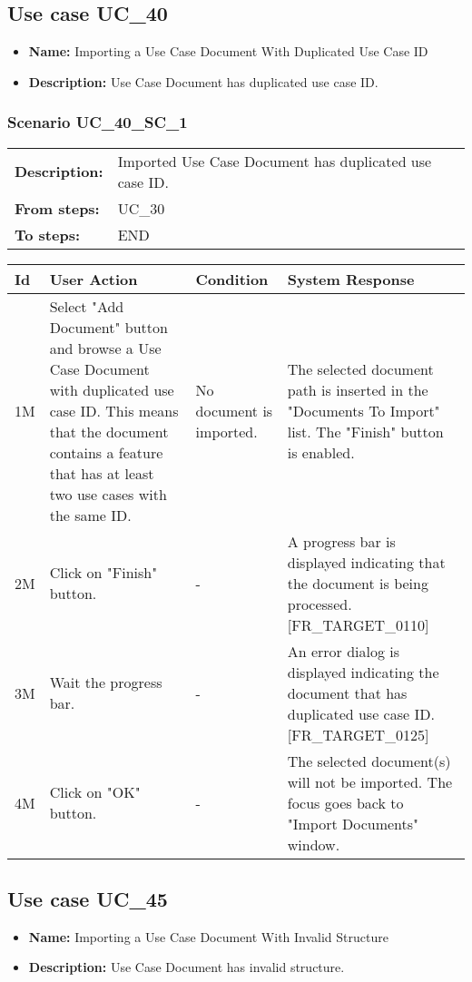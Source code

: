 \documentclass[a4paper,11pt]{article}
\newcommand{\bl}{\\ \hline}
\begin{document}
\subsection*{Use case UC_40}
\begin{itemize}
\item {\bf Name: }Importing a Use Case Document With Duplicated Use Case ID
\item {\bf Description: }Use Case Document has duplicated use case ID.
\end{itemize}
\subsubsection*{Scenario UC_40_SC_1}
\begin{tabular}{p{1in}p{4in}}
{\bf Description:} & Imported Use Case Document has duplicated use case ID. \\
{\bf From steps:} & UC_30#2M \\
{\bf To steps:} & END \\
\end{tabular}
 
\begin{tabular}{|p{0.8in}|p{1.6in}|p{1.6in}|p{1.6in}|}
\hline
Id & User Action & Condition & System Response  \bl 
1M & Select "Add Document" button and browse a Use Case Document with duplicated use case ID. This means that the document contains a feature that has at least two use cases with the same ID. & No document is imported. & The selected document path is inserted in the "Documents To Import" list. The "Finish" button is enabled. \bl 
2M & Click on "Finish" button. & - & A progress bar is displayed indicating that the document is being processed. [FR_TARGET_0110] \bl 
3M & Wait the progress bar. & - & An error dialog is displayed indicating the document that has duplicated use case ID. [FR_TARGET_0125] \bl 
4M & Click on "OK" button. & - & The selected document(s) will not be imported. The focus goes back to "Import Documents" window. \bl 
\end{tabular}
\subsection*{Use case UC_45}
\begin{itemize}
\item {\bf Name: }Importing a Use Case Document With Invalid Structure
\item {\bf Description: }Use Case Document has invalid structure.
\end{itemize}
\end{document}
